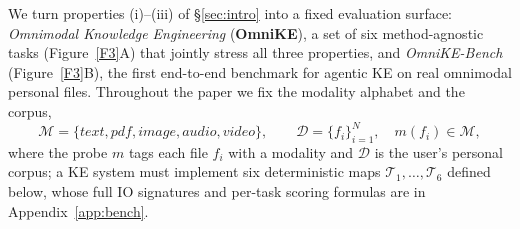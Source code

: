 \documentclass{article}
\begin{document}
We turn properties (i)--(iii) of \S\ref{sec:intro} into a fixed evaluation surface: \emph{Omnimodal Knowledge Engineering} (\textbf{OmniKE}), a set of six method-agnostic tasks (Figure~\ref{F3}A) that jointly stress all three properties, and \emph{OmniKE-Bench} (Figure~\ref{F3}B), the first end-to-end benchmark for agentic KE on real omnimodal personal files. Throughout the paper we fix the modality alphabet and the corpus,
\begin{equation}
\mathcal{M}\!=\!\{\textit{text},\textit{pdf},\textit{image},\textit{audio},\textit{video}\},\qquad \mathcal{D}\!=\!\{f_i\}_{i=1}^{N},\quad m(f_i)\!\in\!\mathcal{M},
\label{eq:notation}
\end{equation}
where the probe $m$ tags each file $f_i$ with a modality and $\mathcal{D}$ is the user's personal corpus; a KE system must implement six deterministic maps $\mathcal{T}_1,\dots,\mathcal{T}_6$ defined below, whose full IO signatures and per-task scoring formulas are in Appendix~\ref{app:bench}.
\end{document}
